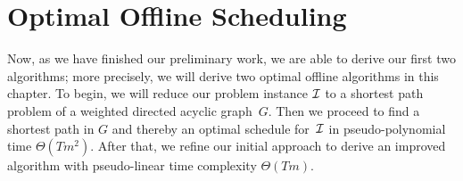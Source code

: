
\chapter{Optimal Offline Scheduling}
Now, as we have finished our preliminary work, we are able to derive our first two algorithms; more precisely, we will derive two optimal offline algorithms in this chapter.
To begin, we will reduce our problem instance $\mathcal{I}$ to a shortest path problem of a weighted directed acyclic graph~$G$. Then we proceed to find a shortest path in $G$ and thereby an optimal schedule for~$\mathcal{I}$ in pseudo-polynomial time $\Theta(Tm^2)$.
After that, we refine our initial approach to derive an improved algorithm with pseudo-linear time complexity $\Theta(Tm)$.

